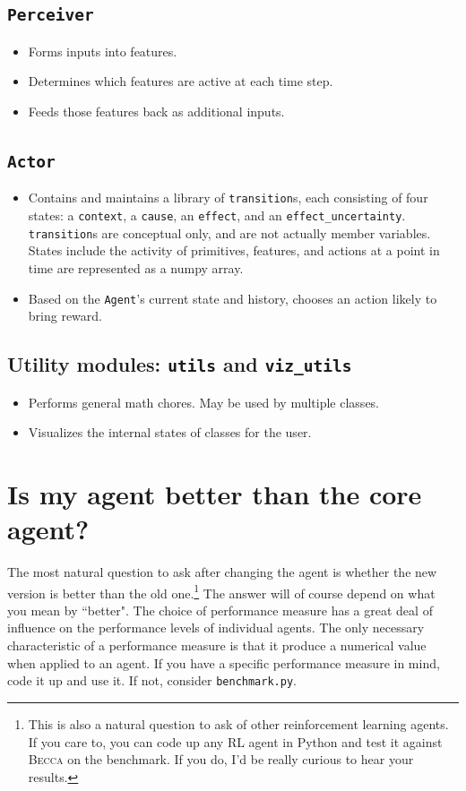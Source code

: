 \subsection{\texttt{Perceiver}}
\begin{itemize}
\item Forms inputs into features.
\item Determines which features are active at each time step.
\item Feeds those features back as additional inputs.
\end{itemize}

\subsection{\texttt{Actor}}
\begin{itemize}
\item Contains and maintains a library of \texttt{transition}s, each consisting of four states: a \texttt{context}, a \texttt{cause}, an \texttt{effect}, and an \texttt{effect\_uncertainty}.  \texttt{transition}s are conceptual only, and are not actually member variables.  States include the activity of primitives, features, and actions at a point in time are represented as a numpy array. 
\item Based on the \texttt{Agent}'s current state and history, chooses an action likely to bring reward.
\end{itemize}

\subsection{Utility modules: \texttt{utils} and \texttt{viz\_utils}}
\begin{itemize}
\item Performs general math chores. May be used by multiple classes.
\item Visualizes the internal states of classes for the user.
\end{itemize}

\section{Is my agent better than the core agent?}
The most natural question to ask after changing the agent is whether the new version is better than the old one.\footnote{This is also a natural question to ask of other reinforcement learning agents. If you care to, you can code up any RL agent in Python and test it against \textsc{Becca} on the benchmark. If you do, I'd be really curious to hear your results.} The answer will of course depend on what you mean by ``better". The choice of performance measure has a great deal of influence on the performance levels of individual agents. The only necessary characteristic of a performance measure is that it produce a numerical value when applied to an agent. If you have a specific performance measure in mind, code it up and use it. If not, consider \texttt{benchmark.py}. 

